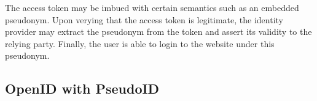 \documentclass{llncs}
\begin{document}

The access token may be imbued with certain semantics such as an embedded
pseudonym. Upon verying that the access token is legitimate, the identity
provider may extract the pseudonym from the token and assert its validity to the
relying party. Finally, the user is able to login to the website under this
pseudonym.

\subsection{OpenID with PseudoID}
\end{document}
